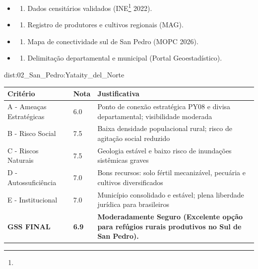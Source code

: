 {\begin{itemize}
\tightlist
\item
  \begin{enumerate}
  \def\labelenumi{\arabic{enumi})}
  \tightlist
  \item
    Dados censitários validados (INE\footnote{\fineINE} 2022).
  \end{enumerate}
\item
  \begin{enumerate}
  \def\labelenumi{\arabic{enumi})}
  \setcounter{enumi}{1}
  \tightlist
  \item
    Registro de produtores e cultivos regionais (MAG).
  \end{enumerate}
\item
  \begin{enumerate}
  \def\labelenumi{\arabic{enumi})}
  \setcounter{enumi}{2}
  \tightlist
  \item
    Mapa de conectividade sul de San Pedro (MOPC 2026).
  \end{enumerate}
\item
  \begin{enumerate}
  \def\labelenumi{\arabic{enumi})}
  \setcounter{enumi}{3}
  \tightlist
  \item
    Delimitação departamental e municipal (Portal Geoestadístico).
  \end{enumerate}
\end{itemize}}{dist:02_San_Pedro:Yataity_del_Norte}
\begin{table}[ht!]
\small \begin{tabular}{p{3.0cm}p{0.8cm}p{6.0cm}} \toprule
\textbf{Critério} & \textbf{Nota} & \textbf{Justificativa} \\ \midrule
A - Ameaças Estratégicas & 6.0 & Ponto de conexão estratégica PY08 e divisa departamental; visibilidade moderada \\
B - Risco Social & 7.5 & Baixa densidade populacional rural; risco de agitação social reduzido \\
C - Riscos Naturais & 7.5 & Geologia estável e baixo risco de inundações sistêmicas graves \\
D - Autossuficiência & 7.0 & Bons recursos: solo fértil mecanizável, pecuária e cultivos diversificados \\
E - Institucional & 7.0 & Município consolidado e estável; plena liberdade jurídica para brasileiros \\
\midrule \textbf{GSS FINAL} & \textbf{6.9} & \textbf{Moderadamente Seguro (Excelente opção para refúgios rurais produtivos no Sul de San Pedro).} \\ \bottomrule \end{tabular}
\end{table}
